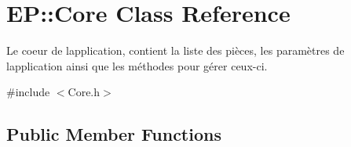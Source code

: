 \hypertarget{class_e_p_1_1_core}{}\section{EP\+:\+:Core Class Reference}
\label{class_e_p_1_1_core}


Le coeur de l\textquotesingle{}application, contient la liste des pièces, les paramètres de l\textquotesingle{}application ainsi que les méthodes pour gérer ceux-\/ci.  




{\ttfamily \#include $<$Core.\+h$>$}

\subsection*{Public Member Functions}
